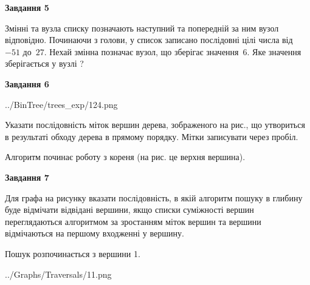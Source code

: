 \documentclass[12pt, ukrainian]{article}
\begin{document}
{\begin {large}
{\begin {center}\textbf{Завдання 5}\end {center}}\par
Змінні  та  вузла списку позначають наступний та попередній за ним вузол відповідно. Починаючи з голови, у список записано послідовні цілі числа від~$-51$ до~$27$. Нехай змінна  позначає вузол, що зберігає значення~$6$.
Яке значення зберігається у вузлі  ?\par
\newpage

{\begin {center}\textbf{Завдання 6}\end {center}}\par

\begin{center}
	{../BinTree/trees_exp/124.png}
\end{center}
Указати послідовність міток вершин дерева, зображеного на рис., що утвориться в результаті обходу дерева в прямому порядку. Мітки записувати через пробіл.\par Алгоритм починає роботу з кореня (на рис. це верхня вершина).\par
\newpage

{\begin {center}\textbf{Завдання 7}\end {center}}\par
Для графа на рисунку вказати послідовність, в якій алгоритм пошуку в глибину буде відмічати відвідані вершини, якщо списки суміжності вершин переглядаються алгоритмом за зростанням міток вершин та вершини відмічаються на першому вход\-женні у вершину.\par
Пошук розпочинається з вершини 1.\par

\begin{center}
	{../Graphs/Traversals/11.png}
\end{center}\par
\newpage


\end{large}}
\end{document}
